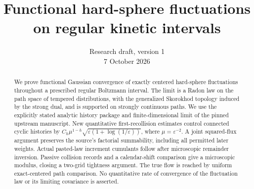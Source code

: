 \documentclass[11pt]{article}
\title{Functional hard-sphere fluctuations\\on regular kinetic intervals}
\author{}
\date{Research draft, version 1\\7 October 2026}
\numberwithin{equation}{section}
\theoremstyle{remark}
\newcommand{\eps}{\varepsilon}
\begin{document}
\maketitle
\begin{abstract}
We prove functional Gaussian convergence of exactly centered hard-sphere
fluctuations throughout a prescribed regular Boltzmann interval.
The limit is a Radon law on the path space of tempered distributions,
with the generalized Skorokhod topology induced by the strong dual,
and is supported on strongly continuous paths. We use the explicitly stated analytic
history package and finite-dimensional limit of the pinned upstream
manuscript. New quantitative first-recollision estimates control connected
cyclic histories by $C_h\mu^{1-h}\sqrt{\eps(1+\log(1/\eps))}$,
where $\mu=\eps^{-2}$. A joint squared-flux argument preserves the source's
factorial summability, including all permitted later weights.
Actual pasted-law increment cumulants follow after microscopic remainder
inversion. Passive collision records and a calendar-shift comparison give
a microscopic modulus, closing a two-grid tightness argument. The true flow
is reached by uniform exact-centered path comparison. No quantitative rate
of convergence of the fluctuation law or its limiting covariance is asserted.
\end{abstract}
\end{document}
